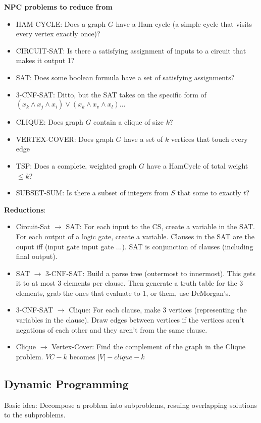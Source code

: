 \documentclass[7pt]{article}
\begin{document}
\begin{multicols*}{4}
{\bf NPC problems to reduce from}
\begin{itemize}
\item HAM-CYCLE: Does a graph $G$ have a Ham-cycle (a simple cycle
  that visits every vertex exactly once)?
\item CIRCUIT-SAT: Is there a satisfying assignment of inputs to a
  circuit that makes it output 1?
\item SAT: Does some boolean formula have a set of satisfying assignments?
\item 3-CNF-SAT: Ditto, but the SAT takes on the specific form of
  $(x_k \wedge x_j \wedge x_i) \vee (x_k \wedge x_v \wedge x_l) ...$
\item CLIQUE: Does graph $G$ contain a clique of size $k$?
\item VERTEX-COVER: Does graph $G$ have a set of $k$ vertices that
  touch every edge
\item TSP: Does a complete, weighted graph $G$ have a HamCycle of
  total weight $\leq k$?
\item SUBSET-SUM: Is there a subset of integers from $S$ that some to
  exactly $t$? 
\end{itemize}

    {\bf Reductions}:
    \begin{itemize}
    \item Circuit-Sat $\rightarrow$ SAT: For each input to the CS, create a
      variable in the SAT.  For each output of a logic gate, create a
      variable.  Clauses in the SAT are the ouput iff (input gate
      input gate ...). SAT is conjunction of clauses (including final
      output).     
    \item SAT $\rightarrow$ 3-CNF-SAT: Build a parse tree (outermost
      to innermost).  This gets it to at most 3 elements per clause.
      Then generate a truth table for the 3 elements, grab the ones
      that evaluate to 1, or them, use DeMorgan's.  
    \item 3-CNF-SAT $\rightarrow$ Clique: For each clause, make 3
      vertices (representing the variables in the clause).  Draw edges
      between vertices if the vertices aren't negations of each other
      and they aren't from the same clause.
    \item Clique $\rightarrow$ Vertex-Cover: Find the complement of
      the graph in the Clique problem.  $VC-k$ becomes $|V| - clique-k$
    \end{itemize}


\subsection*{Dynamic Programming}
Basic idea: Decompose a problem into subproblems, resuing overlapping
solutions to the subproblems.


\end{multicols*}
\end{document}
